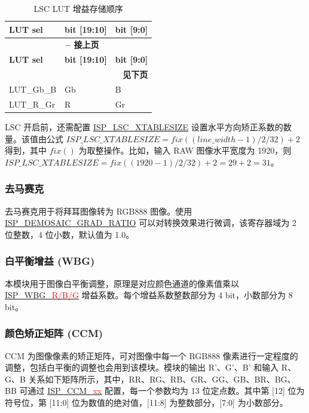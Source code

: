 \documentclass[main\_\_CN.tex]{subfiles}
\begin{document}
\begin{longtable}[c]{ |p{5cm}|p{3cm}|p{3cm}| }
    \caption{LSC LUT 增益存储顺序}
    \label{tab:lsc_lut_order}\\\hline

    \rowcolor{lightgray}
    \textbf{LUT sel} & \textbf{bit [19:10]} & \textbf{bit [9:0]} \\\hline
    \endfirsthead


    \multicolumn{3}{c}{\bfseries \tablename\ \thetable{} -- 接上页}\\\hline
    \rowcolor{lightgray}
    \textbf{LUT sel} & \textbf{bit [19:10]} & \textbf{bit [9:0]} \\\hline
    \endhead

    \multicolumn{3}{r}{\textbf{见下页}} \\
    \endfoot

    \endlastfoot

        LUT\_Gb\_B & Gb & B \\\hline
        LUT\_R\_Gr & R & Gr \\\hline

\end{longtable}

LSC 开启前，还需配置 \hyperref[fielddesc:ISPLSCXTABLESIZE]{ISP\_LSC\_XTABLESIZE} 设置水平方向矫正系数的数量。该值由公式 $ISP\_LSC\_XTABLESIZE = fix((line\_width -1)/2/32) + 2$ 得到，其中 $fix()$ 为取整操作。比如，输入 RAW 图像水平宽度为 1920，则 $ISP\_LSC\_XTABLESIZE = fix((1920-1)/2/32)+2 = 29+2 = 31$。


\subsubsection{去马赛克}
\label{sec:isp_demosaic}
去马赛克用于将拜耳图像转为 RGB888 图像。使用 \hyperref[fielddesc:ISPDEMOSAICGRADRATIO]{ISP\_DEMOSAIC\_GRAD\_RATIO} 可以对转换效果进行微调，该寄存器域为 2 位整数，4 位小数，默认值为 1.0。

\subsubsection{白平衡增益 (WBG)}
\label{sec:isp_wbg}
本模块用于图像白平衡调整，原理是对应颜色通道的像素值乘以 \hyperref[fielddesc:ISPWBGR]{ISP\_WBG\_\textcolor{red}{R/B/G}} 增益系数。每个增益系数整数部分为 4 bit，小数部分为 8 bit。

\subsubsection{颜色矫正矩阵 (CCM)}
\label{sec:isp_ccm}
CCM 为图像像素的矫正矩阵，可对图像中每一个 RGB888 像素进行一定程度的调整，包括白平衡的调整也会用到该模块。模块的输出 R'、G'、B' 和输入 R、G、B 关系如下矩阵所示，其中，RR、RG、RB、GR、GG、GB、BR、BG、BB 可通过 \hyperref[fielddesc:ISPCCMRR]{ISP\_CCM\_\textcolor{red}{xx}} 配置，每一个参数均为 13 位定点数。其中第 [12] 位为符号位，第 [11:0] 位为数值的绝对值，[11:8] 为整数部分，[7:0] 为小数部分。
\end{document}
